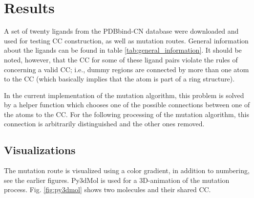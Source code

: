 \chapter{Results}

A set of twenty ligands from the PDBbind-CN database were downloaded and used for testing
CC construction, as well as mutation routes. General information about the ligands can be found in table \ref{tab:general_information}. 
It should be noted, however, that the CC for some of these ligand pairs
violate the rules of {\trafo} concerning a valid CC; i.e., dummy regions are connected by more
than one atom to the CC (which basically implies that the
atom is part of a ring structure). 

In the current implementation of the mutation algorithm, this problem
is solved by a helper function which chooses one of the possible connections
between one of the atoms to the CC. For the following processing
of the mutation algorithm, this connection is arbitrarily distinguished
and the other ones removed. 


\section{Visualizations}

The mutation route is visualized using a color gradient, in addition
to numbering, see the earlier figures.
Py3dMol is used for a 3D-animation of the mutation process. Fig. \ref{fig:py3dmol} shows two molecules and their shared CC.

